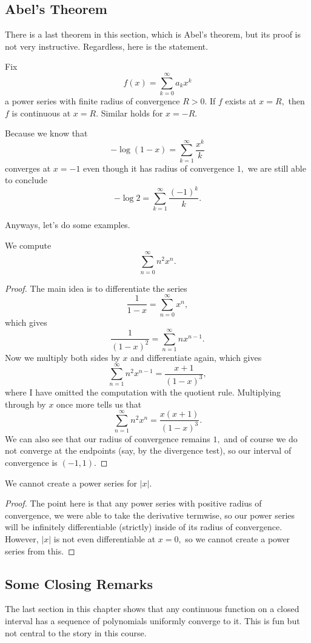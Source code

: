 \subsection{Abel's Theorem}
There is a last theorem in this section, which is Abel's theorem, but its proof is not very instructive. Regardless, here is the statement.
\begin{theorem}
	Fix
	\[f(x)=\sum_{k=0}^\infty a_kx^k\]
	a power series with finite radius of convergence $R>0.$ If $f$ exists at $x=R,$ then $f$ is continuous at $x=R.$ Similar holds for $x=-R.$
\end{theorem}
\begin{example}
	Because we know that
	\[-\log(1-x)=\sum_{k=1}^\infty\frac{x^k}k\]
	converges at $x=-1$ even though it has radius of convergence $1,$ we are still able to conclude
	\[-\log2=\sum_{k=1}^\infty\frac{(-1)^k}k.\]
\end{example}
Anyways, let's do some examples.
\begin{exercise}
	We compute
	\[\sum_{n=0}^\infty n^2x^n.\]
\end{exercise}
\begin{proof}
	The main idea is to differentiate the series
	\[\frac1{1-x}=\sum_{n=0}^\infty x^n,\]
	which gives
	\[\frac1{(1-x)^2}=\sum_{n=1}^\infty nx^{n-1}.\]
	Now we multiply both sides by $x$ and differentiate again, which gives
	\[\sum_{n=1}^\infty n^2x^{n-1}=\frac{x+1}{(1-x)^3},\]
	where I have omitted the computation with the quotient rule. Multiplying through by $x$ once more tells us that
	\[\sum_{n=1}^\infty n^2x^n=\frac{x(x+1)}{(1-x)^3}.\]
	We can also see that our radius of convergence remains $1,$ and of course we do not converge at the endpoints (say, by the divergence test), so our interval of convergence is $(-1,1).$
\end{proof}
\begin{exercise}
	We cannot create a power series for $|x|.$
\end{exercise}
\begin{proof}
	The point here is that any power series with positive radius of convergence, we were able to take the derivative termwise, so our power series will be infinitely differentiable (strictly) inside of its radius of convergence. However, $|x|$ is not even differentiable at $x=0,$ so we cannot create a power series from this.
\end{proof}

\subsection{Some Closing Remarks}
The last section in this chapter shows that any continuous function on a closed interval has a sequence of polynomials uniformly converge to it. This is fun but not central to the story in this course.

